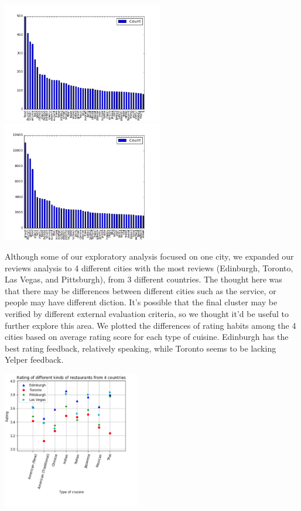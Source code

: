 \documentclass{neu_handout}
\begin{document}
\begin{center}
\includegraphics[width=70mm,scale=0.5]{top50_negativereviews}
\includegraphics[width=70mm,scale=0.5]{top50_positivereviews}
\end{center}

Although some of our exploratory analysis focused on one city, we expanded our reviews analysis to 4 different cities with the most reviews (Edinburgh, Toronto, Las Vegas, and Pittsburgh), from 3 different countries. The thought here was that there may be differences between different cities such as the service, or people may have different diction. It's possible that the final cluster may be verified by different external evaluation criteria, so we thought it'd be useful to further explore this area. We plotted the differences of rating habits among the 4 cities based on average rating score for each type of cuisine. Edinburgh has the best rating feedback, relatively speaking, while Toronto seems to be lacking Yelper feedback.

\begin{center}
	\includegraphics[width=60mm,scale=0.5]{Rating_different_restaurants_countries.png}
\end{center}
\end{document}
